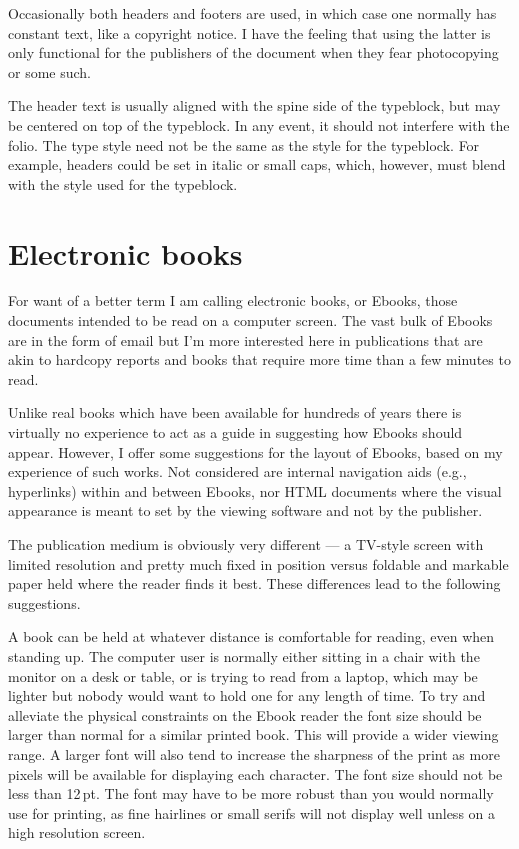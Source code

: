 \documentclass[10pt,letterpaper,extrafontsizes]{memoir}
\newcommand\U[2]{\textrm{#1}\,\textrm{#2}}
\begin{document}
    Occasionally both headers and footers are used, in which case one normally
has constant text, like a copyright notice. 
I have the feeling that using the latter is only functional for the 
publishers of the document when they fear photocopying or some such.

    The header text is usually aligned with the spine side 
of the typeblock, but may be centered on top of the 
typeblock. In any event, it should not interfere with 
the folio. The type style need not be the same as the style 
for the typeblock. For example, headers could be set in italic
or small caps, which, however, must blend with the style used for the 
typeblock.


\section{Electronic books}

    For want of a better term I am calling electronic books, or Ebooks, 
those documents intended to be read on a computer screen. The vast bulk
of Ebooks are in the form of email but I'm more interested here in 
publications that are akin to hardcopy reports and books that require
more time than a few minutes to read.

    Unlike real books which have been available for hundreds of years there
is virtually no experience to act as a guide in suggesting how Ebooks should
appear. However, I offer some suggestions for the layout of Ebooks, based on
my experience of such works. 
Not considered are internal navigation aids
(e.g., hyperlinks) within and between Ebooks, nor HTML documents where
the visual appearance is meant to set by the viewing software and not 
by the publisher.

    The publication medium is obviously very different --- a TV-style 
screen with limited resolution and pretty much fixed in position versus
foldable and markable paper held where the reader finds it best.
These differences lead to the following suggestions.

    A book can be held at whatever distance is comfortable for reading, even
when standing up.
The computer user is normally either sitting in a chair with the monitor
on a desk or table, or is trying to read from a laptop, which may be 
lighter but nobody would want to hold one for any length of time. To try
and alleviate the physical constraints on the Ebook reader the font size
should be larger than normal for a similar printed book. This will provide
a wider viewing range. A larger font will also tend to
increase the sharpness of the print as more pixels will be available for
displaying each character.
    The font size should not be less than \U{12}{pt}. The font may have to be
more robust than you would normally use for printing, as fine hairlines 
or small serifs will not display well unless on a high resolution screen.
\end{document}
